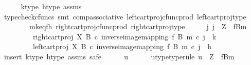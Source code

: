 \begin{isabellebody}
\ \ \ \ \isamarkupfalse%
\ k{\isacharunderscore}{\kern0pt}type\ h{\isacharunderscore}{\kern0pt}type\ assms\isanewline
\ \ \ \ \isamarkupfalse%
\ {\isacharparenleft}{\kern0pt}typecheck{\isacharunderscore}{\kern0pt}cfuncs{\isacharcomma}{\kern0pt}\ smt\ comp{\isacharunderscore}{\kern0pt}associative{}\ left{\isacharunderscore}{\kern0pt}cart{\isacharunderscore}{\kern0pt}proj{\isacharunderscore}{\kern0pt}cfunc{\isacharunderscore}{\kern0pt}prod\ left{\isacharunderscore}{\kern0pt}cart{\isacharunderscore}{\kern0pt}proj{\isacharunderscore}{\kern0pt}type\isanewline
\ \ \ \ \ \ \ \ mk{\isacharunderscore}{\kern0pt}eq{\isacharunderscore}{\kern0pt}fh\ right{\isacharunderscore}{\kern0pt}cart{\isacharunderscore}{\kern0pt}proj{\isacharunderscore}{\kern0pt}cfunc{\isacharunderscore}{\kern0pt}prod\ right{\isacharunderscore}{\kern0pt}cart{\isacharunderscore}{\kern0pt}proj{\isacharunderscore}{\kern0pt}type{\isacharparenright}{\kern0pt}\isanewline
\ \ \isamarkupfalse%
\ \isamarkupfalse%
\ {\isachardoublequoteopen}{\isasymexists}j{\isachardot}{\kern0pt}\ j\ {\isacharcolon}{\kern0pt}\ Z\ {\isasymrightarrow}\ {\isacharparenleft}{\kern0pt}f\isactrlsup {\isacharminus}{\kern0pt}B{\isasymrparr}\isactrlbsub m\isactrlesub {\isacharparenright}{\kern0pt}\ {\isasymand}\isanewline
\ \ \ \ \ \ \ \ \ {\isacharparenleft}{\kern0pt}right{\isacharunderscore}{\kern0pt}cart{\isacharunderscore}{\kern0pt}proj\ X\ B\ {\isasymcirc}\isactrlsub c\ inverse{\isacharunderscore}{\kern0pt}image{\isacharunderscore}{\kern0pt}mapping\ f\ B\ m{\isacharparenright}{\kern0pt}\ {\isasymcirc}\isactrlsub c\ j\ {\isacharequal}{\kern0pt}\ k\ {\isasymand}\isanewline
\ \ \ \ \ \ \ \ \ {\isacharparenleft}{\kern0pt}left{\isacharunderscore}{\kern0pt}cart{\isacharunderscore}{\kern0pt}proj\ X\ B\ {\isasymcirc}\isactrlsub c\ inverse{\isacharunderscore}{\kern0pt}image{\isacharunderscore}{\kern0pt}mapping\ f\ B\ m{\isacharparenright}{\kern0pt}\ {\isasymcirc}\isactrlsub c\ j\ {\isacharequal}{\kern0pt}\ h{\isachardoublequoteclose}\isanewline
\ \ \isamarkupfalse%
\ {\isacharparenleft}{\kern0pt}insert\ k{\isacharunderscore}{\kern0pt}type\ h{\isacharunderscore}{\kern0pt}type\ assms{\isacharcomma}{\kern0pt}\ safe{\isacharparenright}{\kern0pt}\isanewline
\ \ \ \ \isamarkupfalse%
\ u\isanewline
\ \ \ \ \isamarkupfalse%
\ u{\isacharunderscore}{\kern0pt}type{\isacharbrackleft}{\kern0pt}type{\isacharunderscore}{\kern0pt}rule{\isacharbrackright}{\kern0pt}{\isacharcolon}{\kern0pt}\ {\isachardoublequoteopen}u\ {\isacharcolon}{\kern0pt}\ Z\ {\isasymrightarrow}\ {\isacharparenleft}{\kern0pt}f\isactrlsup {\isacharminus}{\kern0pt}B{\isasymrparr}\isactrlbsub m\isactrlesub {\isacharparenright}{\kern0pt}{\isachardoublequoteclose}\isanewline

\end{isabellebody}
